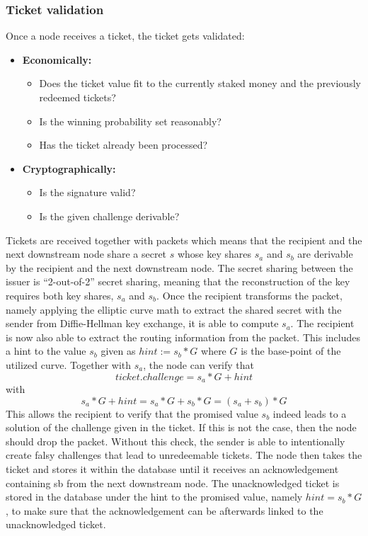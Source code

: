 \subsubsection{Ticket validation}
Once a node receives a ticket, the ticket gets validated:
\begin{itemize}
    \item \textbf{Economically: }
    \begin{itemize}
        \item Does the ticket value fit to the currently staked money and the previously redeemed tickets?
        \item Is the winning probability set reasonably?
        \item Has the ticket already been processed?
    \end{itemize}
    


 
    \item \textbf{Cryptographically:}
    \begin{itemize}
        \item Is the signature valid?
        \item Is the given challenge derivable?
    \end{itemize}
 
\end{itemize}
Tickets are received together with packets which means that the recipient and the next downstream node share a secret $s$ whose key shares $s_a$ and $s_b$ are derivable by the recipient and the next downstream node. 
The secret sharing between the issuer is “2-out-of-2” secret sharing, meaning that the reconstruction of the key requires both key shares, $s_a$ and $s_b$.
\newline Once the recipient transforms the packet, namely applying the elliptic curve math to extract the shared secret with the sender from Diffie-Hellman key exchange, it is able to compute $s_a$. The recipient is now also able to extract the routing information from the packet. 
This includes a hint to the value $s_b$ given as $hint:=s_b*G$ where $G$ is the base-point of the utilized curve. 
Together with $s_a$, the node can verify that $$ticket.challenge=s_a*G+hint$$ with $$s_a*G+hint=s_a*G+s_b*G=(s_a+s_b)*G$$ 
This allows the recipient to verify that the promised value $s_b$ indeed leads to a solution of the challenge given in the ticket. 
If this is not the case, then the node should drop the packet.
Without this check, the sender is able to intentionally create falsy challenges that lead to unredeemable tickets.
The node then takes the ticket and stores it within the database until it receives an acknowledgement containing sb from the next downstream node. 
The unacknowledged ticket is stored in the database under the hint to the promised value, namely $hint=s_b*G$, to make sure that the acknowledgement can be afterwards linked to the unacknowledged ticket.


